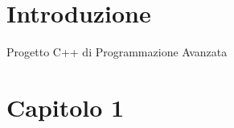 \documentclass[a4paper,12pt]{article}
\begin{document}
\section*{Introduzione} 
Progetto C++ di Programmazione Avanzata


\clearpage
\newpage
\section*{Capitolo 1} %


\end{document}
